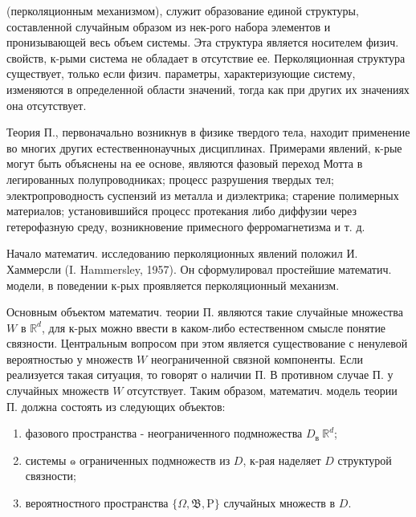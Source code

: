 \documentclass[10pt]{article}
\begin{document}
(перколяционным механизмом), служит образование единой структуры, составленной случайным образом из нек-рого набора элементов и пронизывающей весь объем системы. Эта структура является носителем физич. свойств, к-рыми система не обладает в отсутствие ее. Перколяционная структура существует, только если физич. параметры, характеризующие систему, изменяются в определенной области значений, тогда как при других их значениях она отсутствует.



Теория П., первоначально возникнув в физике твердого тела, находит применение во многих других естественнонаучных дисциплинах. Примерами явлений, к-рые могут быть объяснены на ее основе, являются фазовый переход Мотта в легированных полупроводниках; процесс разрушения твердых тел; электропроводность суспензий из металла и диэлектрика; старение полимерных материалов; установившийся процесс протекания либо диффузии через гетерофазную среду, возникновение примесного ферромагнетизма и т. д.



Начало математич. исследованию перколяционных явлений положил И. Хаммерсли (I. Hammersley, 1957). Он сформулировал простейшие математич. модели, в поведении к-рых проявляется перколяционный механизм.



Основным объектом математич. теории П. являются такие случайные множества $W$ в $\mathbb{R}^{d}$, для к-рых можно ввести в каком-либо естественном смысле понятие связности. Центральным вопросом при этом является существование с ненулевой вероятностью у множеств $W$ неограниченной связной компоненты. Если реализуется такая ситуация, то говорят о наличии П. В противном случае П. у случайных множеств $W$ отсутствует. Таким образом, математич. модель теории П. должна состоять из следующих объектов:



\begin{enumerate}

  \item фазового пространства - неограниченного подмножества $D_{\text {в }} \mathbb{R}^{d}$;



  \item системы $๑$ ограниченных подмножеств из $D$, к-рая наделяет $D$ структурой связности;



  \item вероятностного пространства $\{\Omega, \mathfrak{B}, \mathrm{P}\}$ случайных множеств в $D$.



\end{enumerate}
\end{document}
